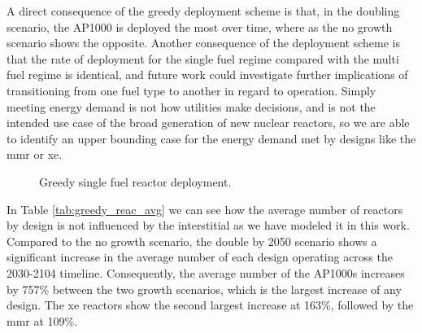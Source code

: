 A direct consequence of the greedy deployment scheme is that, in the doubling scenario, the AP1000 is deployed the most over time, where as the no growth scenario shows the opposite. Another consequence of the deployment scheme is that the rate of deployment for the single fuel regime compared with the multi fuel regime is identical, and future work could investigate further implications of transitioning from one fuel type to another in regard to operation. Simply meeting energy demand is not how utilities make decisions, and is not the intended use case of the broad generation of new nuclear reactors, so we are able to identify an upper bounding case for the energy demand met by designs like the \gls{mmr} or \gls{xe}.


\begin{figure}[H]
  \hfill
  \caption{Greedy single fuel reactor deployment.}
  \label{fig:greedy_of_reactors}
\end{figure}

In Table \ref{tab:greedy_reac_avg} we can see how the average number of reactors by design is not influenced by the interstitial as we have modeled it in this work. Compared to the no growth scenario, the double by 2050 scenario shows a significant increase in the average number of each design operating across the 2030-2104 timeline. Consequently, the average number of the AP1000s increases by 757\% between the two growth scenarios, which is the largest increase of any design. The \gls{xe} reactors show the second largest increase at 163\%, followed by the \gls{mmr} at 109\%.


